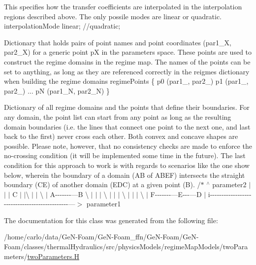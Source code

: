 This specifies how the transfer coefficients are interpolated in the interpolation regions described above. The only possile modes are linear or quadratic. interpolation\+Mode linear; //quadratic;

Dictionary that holds pairs of point names and point coordinates (par1\+\_\+X, par2\+\_\+X) for a generic point pX in the parameters space. These points are used to construct the regime domains in the regime map. The names of the points can be set to anything, as long as they are referenced correctly in the reigmes dictionary when building the regime domains regime\+Points \{ p0 (par1\+\_, par2\+\_) p1 (par1\+\_, par2\+\_) ... pN (par1\+\_\+N, par2\+\_\+N) \}

Dictionary of all regime domains and the points that define their boundaries. For any domain, the point list can start from any point as long as the resulting domain boundaries (i.\+e. the lines that connect one point to the next one, and last back to the first) never cross each other. Both convex and concave shapes are possible. Please note, however, that no consistency checks are made to enforce the no-\/crossing condition (it will be implemented some time in the future). The last condition for this approach to work is with regards to scenarios like the one show below, wherein the boundary of a domain (AB of A\+B\+EF) intersects the straight boundary (CE) of another domain (E\+DC) at a given point (B). /$\ast$ $^\wedge$ parameter2 $\vert$ $\vert$ $\vert$ C $\vert$ $\vert$\textbackslash{} $\vert$ $\vert$ \textbackslash{} $\vert$ A-\/-\/-\/-\/-\/-\/-\/---B \textbackslash{} $\vert$ $\vert$ $\vert$ \textbackslash{} $\vert$ $\vert$ $\vert$ \textbackslash{} $\vert$ $\vert$ $\vert$ \textbackslash{} $\vert$ F-\/-\/-\/-\/-\/-\/-\/---E-\/-\/-\/---D $\vert$ i-\/-\/-\/-\/-\/-\/-\/-\/-\/-\/-\/-\/-\/-\/-\/-\/-\/-\/-\/-\/-\/-\/-\/-\/-\/-\/-\/-\/-\/-\/-\/-\/-\/-\/-\/-\/-\/-\/-\/-\/-\/-\/-\/-\/-\/-\/---$>$ parameter1 

The documentation for this class was generated from the following file\+:\begin{DoxyCompactItemize}
\item 
/home/carlo/data/\+Ge\+N-\/\+Foam/\+Ge\+N-\/\+Foam\+\_\+ffn/\+Ge\+N-\/\+Foam/\+Ge\+N-\/\+Foam/classes/thermal\+Hydraulics/src/physics\+Models/regime\+Map\+Models/two\+Parameters/\hyperlink{twoParameters_8H}{two\+Parameters.\+H}\end{DoxyCompactItemize}
